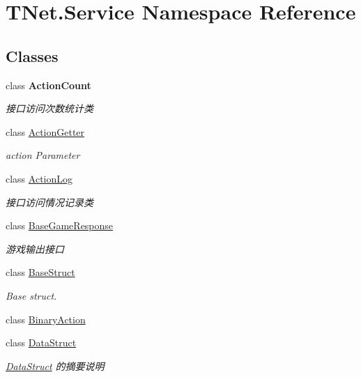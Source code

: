 \hypertarget{namespace_t_net_1_1_service}{}\section{T\+Net.\+Service Namespace Reference}
\label{namespace_t_net_1_1_service}
\subsection*{Classes}
\begin{DoxyCompactItemize}
\item 
class {\bfseries Action\+Count}
\begin{DoxyCompactList}\small\item\em 接口访问次数统计类 \end{DoxyCompactList}\item 
class \mbox{\hyperlink{class_t_net_1_1_service_1_1_action_getter}{Action\+Getter}}
\begin{DoxyCompactList}\small\item\em action Parameter \end{DoxyCompactList}\item 
class \mbox{\hyperlink{class_t_net_1_1_service_1_1_action_log}{Action\+Log}}
\begin{DoxyCompactList}\small\item\em 接口访问情况记录类 \end{DoxyCompactList}\item 
class \mbox{\hyperlink{class_t_net_1_1_service_1_1_base_game_response}{Base\+Game\+Response}}
\begin{DoxyCompactList}\small\item\em 游戏输出接口 \end{DoxyCompactList}\item 
class \mbox{\hyperlink{class_t_net_1_1_service_1_1_base_struct}{Base\+Struct}}
\begin{DoxyCompactList}\small\item\em Base struct. \end{DoxyCompactList}\item 
class \mbox{\hyperlink{class_t_net_1_1_service_1_1_binary_action}{Binary\+Action}}
\item 
class \mbox{\hyperlink{class_t_net_1_1_service_1_1_data_struct}{Data\+Struct}}
\begin{DoxyCompactList}\small\item\em \mbox{\hyperlink{class_t_net_1_1_service_1_1_data_struct}{Data\+Struct}} 的摘要说明 \end{DoxyCompactList}\item 

\end{DoxyCompactItemize}
